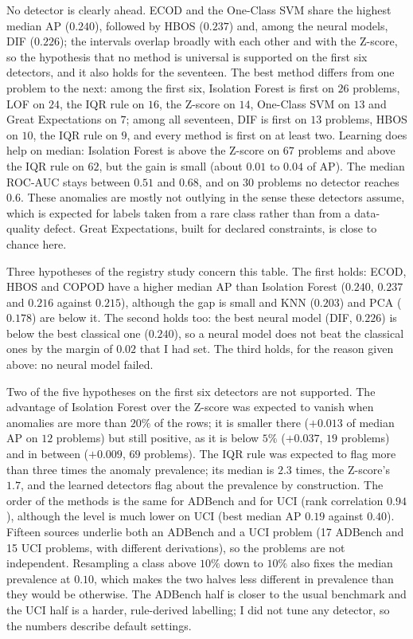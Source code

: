 \documentclass[conference]{IEEEtran}
\begin{document}
No detector is clearly ahead. ECOD and the One-Class SVM share the highest median
AP ($0.240$), followed by HBOS ($0.237$) and, among the neural models, DIF
($0.226$); the intervals overlap broadly with each other and with the Z-score, so
the hypothesis that no method is universal is supported on the first six
detectors, and it also holds for the seventeen. The best method differs from one
problem to the next: among the first six, Isolation Forest is first on $26$ problems, LOF on $24$, the IQR rule on
$16$, the Z-score on $14$, One-Class SVM on $13$ and Great Expectations on $7$; among
all seventeen, DIF is first on $13$ problems, HBOS on $10$, the IQR rule on $9$, and every
method is first on at least two.
Learning does help on median: Isolation Forest is above the Z-score on $67$
problems and above the IQR rule on $62$, but the gain is small (about $0.01$ to
$0.04$ of AP). The median ROC-AUC stays between $0.51$ and $0.68$, and on
$30$ problems no detector reaches $0.6$. These anomalies are mostly not outlying
in the sense these detectors assume, which is expected for labels taken from a
rare class rather than from a data-quality defect. Great Expectations, built for
declared constraints, is close to chance here.

Three hypotheses of the registry study concern this table. The first holds: ECOD, HBOS and COPOD
have a higher median AP than Isolation Forest ($0.240$, $0.237$ and $0.216$ against
$0.215$), although the gap is small and KNN ($0.203$) and PCA ($0.178$) are below it. The
second holds too: the best neural model (DIF, $0.226$) is below the best classical one
($0.240$), so a neural model does not beat the classical ones by the margin of $0.02$ that I
had set. The third holds, for the reason given above: no neural model failed.

Two of the five hypotheses on the first six detectors are not supported. The advantage of Isolation Forest
over the Z-score was expected to vanish when anomalies are more than $20\%$ of
the rows; it is smaller there ($+0.013$ of median AP on $12$ problems) but
still positive, as it is below $5\%$ ($+0.037$, $19$ problems) and in between
($+0.009$, $69$ problems). The IQR rule was expected to flag more than three
times the anomaly prevalence; its median is $2.3$ times, the Z-score's $1.7$,
and the learned detectors flag about the prevalence by construction. The order
of the methods is the same for ADBench and for UCI (rank correlation $0.94$),
although the level is much lower on UCI (best median AP $0.19$ against
$0.40$). Fifteen sources underlie both an ADBench and a UCI problem (17 ADBench and 15 UCI
problems, with different derivations), so the problems are not independent. Resampling a class above
$10\%$ down to $10\%$ also fixes the median prevalence at $0.10$, which makes the two halves less
different in prevalence than they would be otherwise. The ADBench half is closer to the usual benchmark and the
UCI half is a harder, rule-derived labelling; I did not tune any detector, so
the numbers describe default settings.
\end{document}
